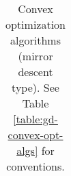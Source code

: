 \documentclass[reqno,oneside,a4paper]{amsart}
\begin{document}
\begin{landscape}
\begin{table}[htdp]
\begin{center}
\begin{tabular}{|l|p{5.5cm}|p{5.5cm}|p{5.5cm}|}
\end{tabular}
\caption{Convex optimization algorithms (mirror descent type). See Table \ref{table:gd-convex-opt-algs} for conventions.  }
\end{center}
\label{table:md-convex-opt-algs}
\end{table}

\end{landscape}
\end{document}
